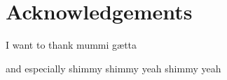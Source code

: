 \chapter{Acknowledgements} \label{acknowledgements}

I want to thank mummi gætta



and especially shimmy shimmy yeah shimmy yeah 


